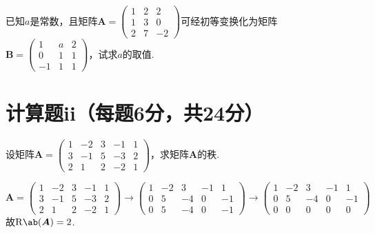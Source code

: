 \begin{exercise}
    已知$a$是常数，且矩阵$\boldsymbol{A}=
    \begin{pmatrix}
        1 & 2 & 2\\
        1 & 3 & 0\\
        2 & 7 & -2
    \end{pmatrix}
    $可经初等变换化为矩阵$\boldsymbol{B}=
    \begin{pmatrix}
        1 & a & 2\\
        0 &1 & 1\\
        -1 & 1 & 1
    \end{pmatrix}
    $，试求$a$的取值.
\end{exercise}
\begin{solution}
    
\end{solution}
\section{计算题ii（每题6分，共24分）}
\vspace{-1em}
\begin{exercise}
    设矩阵$\boldsymbol{A}=
    \begin{pmatrix}
        1 & -2 & 3 & -1 & 1\\
        3 & -1 & 5 & -3 & 2\\
        2 & 1 & 2 & -2 & 1
    \end{pmatrix}
    $，求矩阵$\boldsymbol{A}$的秩.
\end{exercise}
\begin{solution}
    $$\boldsymbol{A}=
    \begin{pmatrix}
        1 & -2 & 3 & -1 & 1\\
        3 & -1 & 5 & -3 & 2\\
        2 & 1 & 2 & -2 & 1
    \end{pmatrix}\longrightarrow
    \begin{pmatrix}
        1 & -2 & 3 & -1 & 1\\
        0 & 5 & -4 & 0 & -1\\
        0 & 5 & -4 & 0 & -1
    \end{pmatrix}\longrightarrow
    \begin{pmatrix}
        1 & -2 & 3 & -1 & 1\\
        0 & 5 & -4 & 0 & -1\\
        0 & 0 & 0 & 0 & 0
    \end{pmatrix}
    $$
    故$\mathrm{R}\ab(\boldsymbol{A})=2$.
\end{solution}

